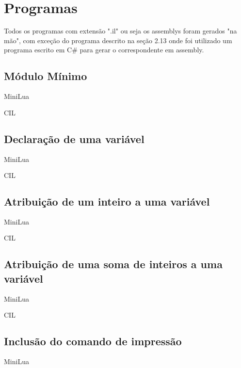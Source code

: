 \documentclass[12pt,a4paper]{report}
\begin{document}
\chapter{Programas}
Todos os programas com extensão ".il" ou seja os assemblys foram gerados "na mão", com exceção do programa descrito na seção 2.13 onde foi utilizado um programa escrito em C\# para gerar o correspondente em assembly.  

\section{Módulo Mínimo}
MiniLua


CIL




\section{Declaração de uma variável}
 MiniLua


CIL




\section{Atribuição de um inteiro a uma variável }

MiniLua


CIL




\section{Atribuição de uma soma de inteiros a uma variável }
MiniLua


CIL




\section{Inclusão do comando de impressão }
MiniLua

\end{document}
